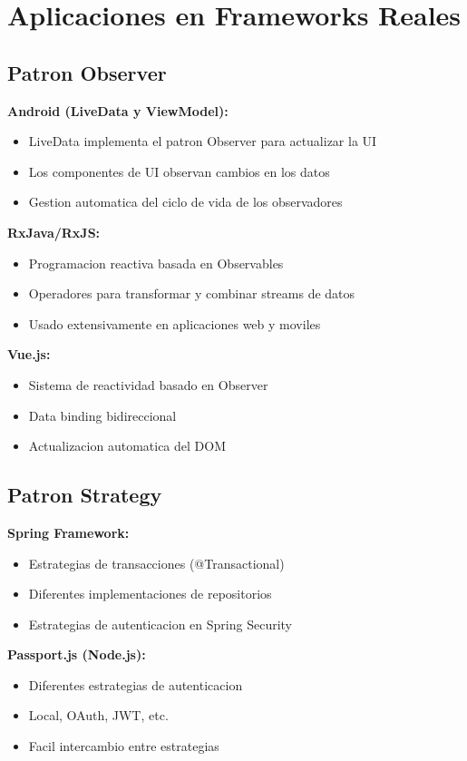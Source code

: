 \documentclass[11pt,a4paper]{article}
\begin{document}
\section{Aplicaciones en Frameworks Reales}

\subsection{Patron Observer}

\textbf{Android (LiveData y ViewModel):}
\begin{itemize}
    \item LiveData implementa el patron Observer para actualizar la UI
    \item Los componentes de UI observan cambios en los datos
    \item Gestion automatica del ciclo de vida de los observadores
\end{itemize}

\textbf{RxJava/RxJS:}
\begin{itemize}
    \item Programacion reactiva basada en Observables
    \item Operadores para transformar y combinar streams de datos
    \item Usado extensivamente en aplicaciones web y moviles
\end{itemize}

\textbf{Vue.js:}
\begin{itemize}
    \item Sistema de reactividad basado en Observer
    \item Data binding bidireccional
    \item Actualizacion automatica del DOM
\end{itemize}

\subsection{Patron Strategy}

\textbf{Spring Framework:}
\begin{itemize}
    \item Estrategias de transacciones (@Transactional)
    \item Diferentes implementaciones de repositorios
    \item Estrategias de autenticacion en Spring Security
\end{itemize}

\textbf{Passport.js (Node.js):}
\begin{itemize}
    \item Diferentes estrategias de autenticacion
    \item Local, OAuth, JWT, etc.
    \item Facil intercambio entre estrategias
\end{itemize}
\end{document}
